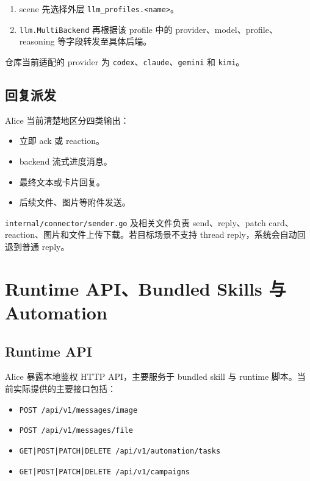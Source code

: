 \documentclass[12pt,a4paper]{ctexart}
\begin{document}
\begin{enumerate}
  \item scene 先选择外层 \texttt{llm\_profiles.<name>}。
  \item \texttt{llm.MultiBackend} 再根据该 profile 中的 provider、model、profile、reasoning 等字段转发至具体后端。
\end{enumerate}

仓库当前适配的 provider 为 \texttt{codex}、\texttt{claude}、\texttt{gemini} 和 \texttt{kimi}。

\subsection{回复派发}

Alice 当前清楚地区分四类输出：

\begin{itemize}
  \item 立即 ack 或 reaction。
  \item backend 流式进度消息。
  \item 最终文本或卡片回复。
  \item 后续文件、图片等附件发送。
\end{itemize}

\texttt{internal/connector/sender.go} 及相关文件负责 send、reply、patch card、reaction、图片和文件上传下载。若目标场景不支持 thread reply，系统会自动回退到普通 reply。

\section{Runtime API、Bundled Skills 与 Automation}

\subsection{Runtime API}

Alice 暴露本地鉴权 HTTP API，主要服务于 bundled skill 与 runtime 脚本。当前实际提供的主要接口包括：

\begin{itemize}
  \item \texttt{POST /api/v1/messages/image}
  \item \texttt{POST /api/v1/messages/file}
  \item \texttt{GET|POST|PATCH|DELETE /api/v1/automation/tasks}
  \item \texttt{GET|POST|PATCH|DELETE /api/v1/campaigns}
\end{itemize}
\end{document}
